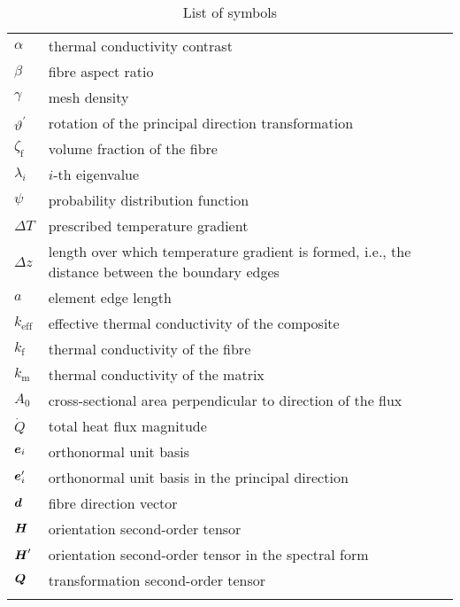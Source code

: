 \begin{table}[!h]
\centering
\caption{List of symbols}\label{table:symbols}
\begin{tabular}{>{\centering}p{}>{\small}p{}}
\toprule\noalign{\smallskip}
$\alpha$           & thermal conductivity contrast\\
$\beta$           & fibre aspect ratio\\
$\gamma$           & mesh density\\
$\vartheta^\prime$   & rotation of the principal direction transformation\\
$\zeta_{\text{f}}$  & volume fraction of the fibre\\
$\lambda_i$        & $i$-th eigenvalue\\
$\psi$             & probability distribution function\\
$\Delta T$       & prescribed temperature gradient\\
$\Delta z$         & length over which temperature gradient is formed, i.e., the distance between the boundary edges\\
$a$                & element edge length\\
$k_{\text{eff}}$   & effective thermal conductivity of the composite\\
$k_{\text{f}}$     & thermal conductivity of the fibre\\
$k_{\text{m}}$     & thermal conductivity of the matrix\\
$A_0$              & cross-sectional area perpendicular to direction of the flux\\
$\dot{Q}$          & total heat flux magnitude\\
$\tena{e}_i$       & orthonormal unit basis\\
$\tena{e}_i^\prime$     & orthonormal unit basis in the principal direction\\
$\tena{d}$         & fibre direction vector\\
$\tenb{H}$         & orientation second-order tensor\\
$\tenb{H}^\prime $      & orientation second-order tensor in the spectral form\\
$\tenb{Q}$         & transformation second-order tensor\\
\noalign{\smallskip}\bottomrule\noalign{\smallskip}
\end{tabular}
\end{table}

